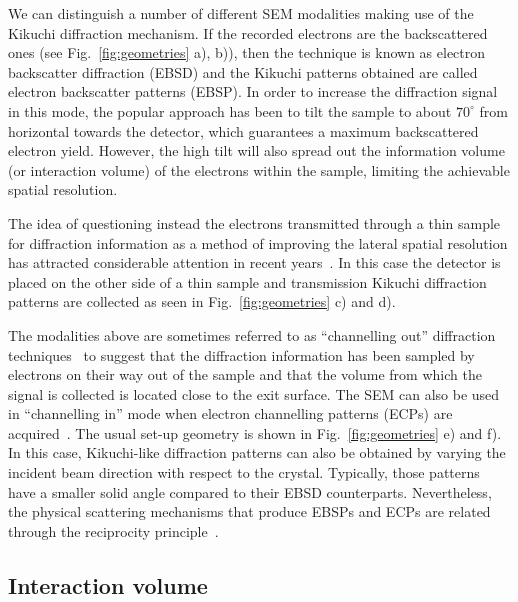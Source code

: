 We can distinguish a number of different SEM modalities making use of the Kikuchi diffraction mechanism. If the recorded electrons are the backscattered ones (see Fig.~\ref{fig:geometries} a), b)), then the technique is known as electron backscatter diffraction (EBSD) and the Kikuchi patterns obtained are called electron backscatter patterns (EBSP).  In order to increase the diffraction signal in this mode, the popular approach has been to tilt the sample to about $70^{\circ}$ from horizontal towards the detector, which guarantees a maximum backscattered electron yield. However, the high tilt will also spread out the information volume (or interaction volume) of the electrons within the sample, limiting the achievable spatial resolution.


The idea of questioning instead the electrons transmitted through a thin sample for diffraction information as a method of improving the lateral spatial resolution has attracted considerable attention in recent years~\cite{trimby2012,Keller12}. In this case the detector is placed on the other side of a thin sample and transmission Kikuchi diffraction patterns are collected as seen in Fig.~\ref{fig:geometries} c) and d).


The modalities above are sometimes referred to as ``channelling out'' diffraction techniques~\cite{joy1994} to suggest that the diffraction information has been sampled by electrons on their way out of the sample and that the volume from which the signal is collected is located close to the exit surface. The SEM can also be used in ``channelling in'' mode when electron channelling patterns (ECPs) are acquired~\cite{coates1967,joy1982}. The usual set-up  geometry is shown in Fig.~\ref{fig:geometries} e) and f). In this case, Kikuchi-like diffraction patterns can also be obtained by varying the incident beam direction with respect to the crystal. Typically, those patterns have a smaller solid angle compared to their EBSD counterparts. Nevertheless, the physical scattering mechanisms that produce EBSPs and ECPs are related through the reciprocity principle~\cite{reimerSEM}.

\subsection{Interaction volume}


